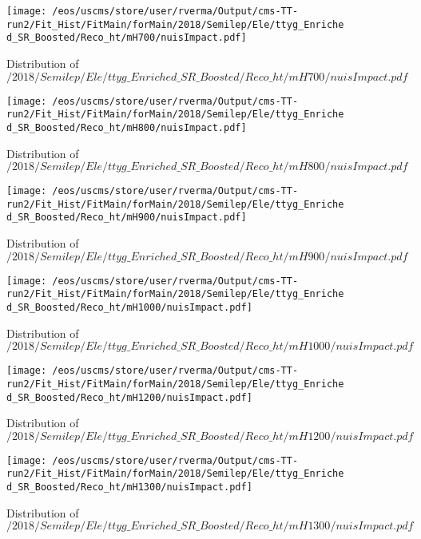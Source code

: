 \begin{figure}
\centering
\texttt{[image: /eos/uscms/store/user/rverma/Output/cms-TT-run2/Fit\_Hist/FitMain/forMain/2018/Semilep/Ele/ttyg\_Enriched\_SR\_Boosted/Reco\_ht/mH700/nuisImpact.pdf]}
\caption{Distribution of $/2018/Semilep/Ele/ttyg\_Enriched\_SR\_Boosted/Reco\_ht/mH700/nuisImpact.pdf$}
\end{figure}

\begin{figure}
\centering
\texttt{[image: /eos/uscms/store/user/rverma/Output/cms-TT-run2/Fit\_Hist/FitMain/forMain/2018/Semilep/Ele/ttyg\_Enriched\_SR\_Boosted/Reco\_ht/mH800/nuisImpact.pdf]}
\caption{Distribution of $/2018/Semilep/Ele/ttyg\_Enriched\_SR\_Boosted/Reco\_ht/mH800/nuisImpact.pdf$}
\end{figure}

\begin{figure}
\centering
\texttt{[image: /eos/uscms/store/user/rverma/Output/cms-TT-run2/Fit\_Hist/FitMain/forMain/2018/Semilep/Ele/ttyg\_Enriched\_SR\_Boosted/Reco\_ht/mH900/nuisImpact.pdf]}
\caption{Distribution of $/2018/Semilep/Ele/ttyg\_Enriched\_SR\_Boosted/Reco\_ht/mH900/nuisImpact.pdf$}
\end{figure}

\begin{figure}
\centering
\texttt{[image: /eos/uscms/store/user/rverma/Output/cms-TT-run2/Fit\_Hist/FitMain/forMain/2018/Semilep/Ele/ttyg\_Enriched\_SR\_Boosted/Reco\_ht/mH1000/nuisImpact.pdf]}
\caption{Distribution of $/2018/Semilep/Ele/ttyg\_Enriched\_SR\_Boosted/Reco\_ht/mH1000/nuisImpact.pdf$}
\end{figure}

\begin{figure}
\centering
\texttt{[image: /eos/uscms/store/user/rverma/Output/cms-TT-run2/Fit\_Hist/FitMain/forMain/2018/Semilep/Ele/ttyg\_Enriched\_SR\_Boosted/Reco\_ht/mH1200/nuisImpact.pdf]}
\caption{Distribution of $/2018/Semilep/Ele/ttyg\_Enriched\_SR\_Boosted/Reco\_ht/mH1200/nuisImpact.pdf$}
\end{figure}

\begin{figure}
\centering
\texttt{[image: /eos/uscms/store/user/rverma/Output/cms-TT-run2/Fit\_Hist/FitMain/forMain/2018/Semilep/Ele/ttyg\_Enriched\_SR\_Boosted/Reco\_ht/mH1300/nuisImpact.pdf]}
\caption{Distribution of $/2018/Semilep/Ele/ttyg\_Enriched\_SR\_Boosted/Reco\_ht/mH1300/nuisImpact.pdf$}
\end{figure}

